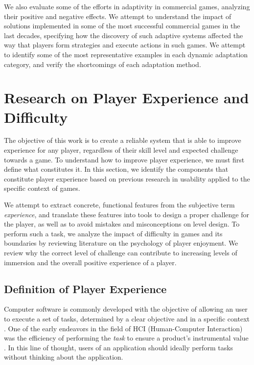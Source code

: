 We also evaluate some of the efforts in adaptivity in commercial games, analyzing their positive and negative effects. We attempt to understand the impact of solutions implemented in some of the most successful commercial games in the last decades, specifying how the discovery of such adaptive systems affected the way that players form strategies and execute actions in such games. We attempt to identify some of the most representative examples in each dynamic adaptation category, and verify the shortcomings of each adaptation method.


\section{Research on Player Experience and Difficulty}

The objective of this work is to create a reliable system that is able to improve experience for any player, regardless of their skill level and expected challenge towards a game. To understand how to improve player experience, we must first define what constitutes it. In this section, we identify the components that constitute player experience based on previous research in usability applied to the specific context of games. 

We attempt to extract concrete, functional features from the subjective term \emph{experience}, and translate these features into tools to design a proper challenge for the player, as well as to avoid mistakes and misconceptions on level design. To perform such a task, we analyze the impact of difficulty in games and its boundaries by reviewing literature on the psychology of player enjoyment. We review why the correct level of challenge can contribute to increasing levels of immersion and the overall positive experience of a player.

\subsection{Definition of Player Experience}

Computer software is commonly developed with the objective of allowing an user to execute a set of tasks, determined by a clear objective and in a specific context \cite{ARTICLE_FromUsabilityToPlayability}. One of the early endeavors in the field of HCI (Human-Computer Interaction) was the efficiency of performing the \emph{task} to ensure a product's instrumental value \cite{ARTICLE_UserExperienceAResearchAgenda}. In this line of thought, users of an application should ideally perform tasks without thinking about the application. 

